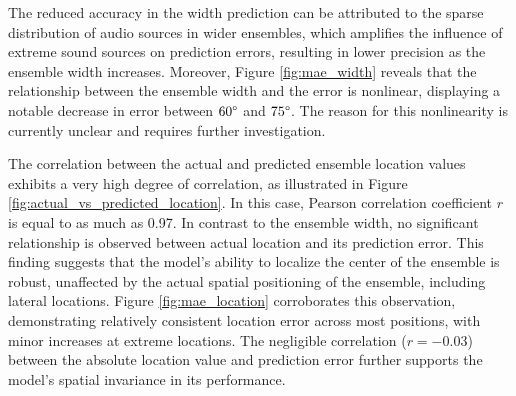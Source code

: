 \documentclass[11pt]{article}
\begin{document}
The reduced accuracy in the width prediction can be attributed to the sparse distribution of audio sources in wider ensembles, which amplifies the influence of extreme sound sources on prediction errors, resulting in lower precision as the ensemble width increases. Moreover, Figure \ref{fig:mae_width} reveals that the relationship between the ensemble width and the error is nonlinear, displaying a notable decrease in error between $60\degree$ and $75\degree$. The reason for this nonlinearity is currently unclear and requires further investigation.

The correlation between the actual and predicted ensemble location values exhibits a very high degree of correlation, as illustrated in Figure \ref{fig:actual_vs_predicted_location}. In this case, Pearson correlation coefficient $r$ is equal to as much as 0.97. In contrast to the ensemble width, no significant relationship is observed between actual location and its prediction error. This finding suggests that the model's ability to localize the center of the ensemble is robust, unaffected by the actual spatial positioning of the ensemble, including lateral locations. Figure \ref{fig:mae_location} corroborates this observation, demonstrating relatively consistent location error across most positions, with minor increases at extreme locations. The negligible correlation ($r = -0.03$) between the absolute location value and prediction error further supports the model's spatial invariance in its performance.
\end{document}
